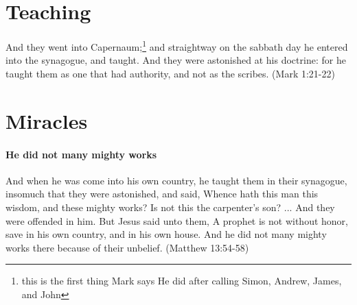 \section{Teaching}
And they went into Capernaum;\footnote{this is the first thing Mark says He did after calling Simon, Andrew, James, and John} and straightway on the sabbath day he entered into the synagogue, and taught. And they were astonished at his doctrine: for he taught them as one that had authority, and not as the scribes. (Mark 1:21-22)

\section{Miracles}

\paragraph{He did not many mighty works}
And when he was come into his own country, he taught them in their synagogue, insomuch that they were astonished, and said, Whence hath this man this wisdom, and these mighty works? Is not this the carpenter's son? ... And they were offended in him. But Jesus said unto them, A prophet is not without honor, save in his own country, and in his own house. And he did not many mighty works there because of their unbelief. (Matthew 13:54-58)

